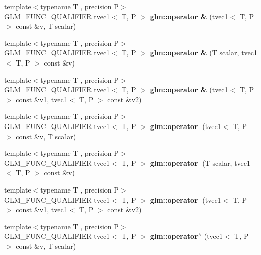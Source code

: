 \begin{DoxyCompactItemize}
{\footnotesize template$<$typename T , precision P$>$ }\\G\+L\+M\+\_\+\+F\+U\+N\+C\+\_\+\+Q\+U\+A\+L\+I\+F\+I\+ER tvec1$<$ T, P $>$ {\bfseries glm\+::operator \&} (tvec1$<$ T, P $>$ const \&v, T scalar)
\item 
\mbox{\label{type__vec1_8inl_afaba8f3565e184dd8989c31cb1fd7997}} 
{\footnotesize template$<$typename T , precision P$>$ }\\G\+L\+M\+\_\+\+F\+U\+N\+C\+\_\+\+Q\+U\+A\+L\+I\+F\+I\+ER tvec1$<$ T, P $>$ {\bfseries glm\+::operator \&} (T scalar, tvec1$<$ T, P $>$ const \&v)
\item 
\mbox{\label{type__vec1_8inl_a29fe6ad132aa4548f1092f1b7a28026c}} 
{\footnotesize template$<$typename T , precision P$>$ }\\G\+L\+M\+\_\+\+F\+U\+N\+C\+\_\+\+Q\+U\+A\+L\+I\+F\+I\+ER tvec1$<$ T, P $>$ {\bfseries glm\+::operator \&} (tvec1$<$ T, P $>$ const \&v1, tvec1$<$ T, P $>$ const \&v2)
\item 
\mbox{\label{type__vec1_8inl_a48ab816265c765be1feda2afff6276ee}} 
{\footnotesize template$<$typename T , precision P$>$ }\\G\+L\+M\+\_\+\+F\+U\+N\+C\+\_\+\+Q\+U\+A\+L\+I\+F\+I\+ER tvec1$<$ T, P $>$ {\bfseries glm\+::operator$\vert$} (tvec1$<$ T, P $>$ const \&v, T scalar)
\item 
\mbox{\label{type__vec1_8inl_ae51e45f5dc9f6799b17e67715a0d632b}} 
{\footnotesize template$<$typename T , precision P$>$ }\\G\+L\+M\+\_\+\+F\+U\+N\+C\+\_\+\+Q\+U\+A\+L\+I\+F\+I\+ER tvec1$<$ T, P $>$ {\bfseries glm\+::operator$\vert$} (T scalar, tvec1$<$ T, P $>$ const \&v)
\item 
\mbox{\label{type__vec1_8inl_a4f13423d9e8ce29a4ff6569e689e442f}} 
{\footnotesize template$<$typename T , precision P$>$ }\\G\+L\+M\+\_\+\+F\+U\+N\+C\+\_\+\+Q\+U\+A\+L\+I\+F\+I\+ER tvec1$<$ T, P $>$ {\bfseries glm\+::operator$\vert$} (tvec1$<$ T, P $>$ const \&v1, tvec1$<$ T, P $>$ const \&v2)
\item 
\mbox{\label{type__vec1_8inl_a82f1b8a608f9ef3e6212d6e4bfb10e88}} 
{\footnotesize template$<$typename T , precision P$>$ }\\G\+L\+M\+\_\+\+F\+U\+N\+C\+\_\+\+Q\+U\+A\+L\+I\+F\+I\+ER tvec1$<$ T, P $>$ {\bfseries glm\+::operator$^\wedge$} (tvec1$<$ T, P $>$ const \&v, T scalar)

\end{DoxyCompactItemize}
